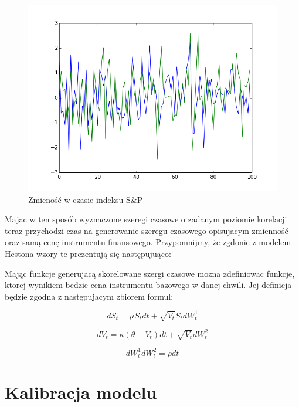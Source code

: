\documentclass{pracamgr}
\begin{document}
\begin{figure}
  \centering
  \includegraphics[width=150mm]{corr.png}
  \caption{Zmieność w czasie indeksu S\&P}\label{fig:vix}
\end{figure}

Majac w ten sposób wyznaczone szeregi czasowe o zadanym poziomie korelacji teraz przychodzi czas na generowanie szeregu czasowego opisujacym zmienność oraz samą cenę instrumentu finansowego. 
Przypomnijmy, że zgdonie z modelem Hestona wzory te prezentują się następujuąco:

Mając funkcje generujacą skorelowane szergi czasowe mozna zdefiniowac funkcje, ktorej wynikiem bedzie cena instrumentu bazowego w danej chwili. Jej definicja będzie zgodna z następujacym zbiorem formul: \cite{OptimalInvestment2010}

\begin{equation}
dS_t =  \mu S_t  dt + \sqrt{V_t}S_t dW_t^1
\end{equation}

\begin{equation}
dV_t =  \kappa (\theta - V_t)  dt + \sqrt{V_t} dW_t^2
\end{equation}

\begin{equation}
dW_t^1 dW_t^2  = \rho dt
\end{equation}


\chapter{Kalibracja modelu}
\end{document}
